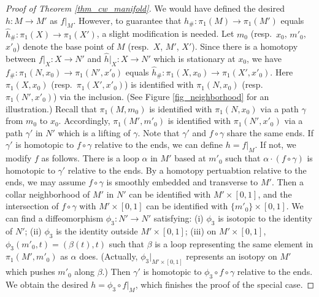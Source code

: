 \documentclass[12pt]{amsart}
\theoremstyle{plain}
\theoremstyle{definition}
\theoremstyle{question}
\theoremstyle{remark}
\theoremstyle{assumption}
\numberwithin{equation}{section}
\theoremstyle{bigthm}
\begin{document}
\begin{proof}[Proof of Theorem \ref{thm_cw_manifold}]
We would have defined the desired $h \colon  M \rightarrow M'$ as $f|_{M}$. However, to guarantee that $h_{\#} \colon  \pi_{1} (M) \rightarrow \pi_{1} (M')$ equals $\hat{h}_{\#} \colon  \pi_{1} (X) \rightarrow \pi_{1} (X')$, a slight modification is needed. Let $m_{0}$ (resp.~$x_{0}$, $m'_{0}$, $x'_{0}$) denote the base point of $M$ (resp.~$X$, $M'$, $X'$). Since there is a homotopy between $f|_{X} \colon  X \rightarrow N'$ and $\hat{h}|_{X} \colon  X \rightarrow N'$ which is stationary at $x_{0}$,  we have $f_{\#} \colon  \pi_{1} (N, x_{0}) \rightarrow \pi_{1} (N', x'_{0})$ equals $\hat{h}_{\#} \colon  \pi_{1} (X, x_{0}) \rightarrow \pi_{1} (X', x'_{0})$. Here $\pi_{1} (X, x_{0})$ (resp.~$\pi_{1} (X', x'_{0})$) is identified with $\pi_{1} (N, x_{0})$ (resp.~$\pi_{1} (N', x'_{0})$) via the inclusion. (See Figure \ref{fig_neighborhood} for an illustration.) Recall that $\pi_{1} (M, m_{0})$ is identified with $\pi_{1} (N, x_{0})$ via a path $\gamma$ from $m_{0}$ to $x_{0}$. Accordingly, $\pi_{1} (M', m'_{0})$ is identified with $\pi_{1} (N', x'_{0})$ via a path $\gamma'$ in $N'$ which is a lifting of $\gamma$. Note that $\gamma'$ and $f \circ \gamma$ share the same ends. If $\gamma'$ is homotopic to $f \circ \gamma$ relative to the ends, we can define $h= f|_{M}$. If not, we modify $f$ as follows. There is a loop $\alpha$ in $M'$ based at $m'_{0}$ such that $\alpha \cdot (f \circ \gamma)$ is homotopic to $\gamma'$ relative to the ends. By a homotopy pertuabtion relative to the ends, we may assume $f \circ \gamma$ is smoothly embedded and transverse to $M'$. Then a collar neighborhood of $M'$ in $N'$ can be identified with $M' \times [0,1]$, and the intersection of $f \circ \gamma$ with $M' \times [0,1]$ can be identified with $\{ m'_{0} \} \times [0,1]$. We can find a diffeomorphism $\phi_{3} \colon  N' \rightarrow N'$ satisfying: (i) $\phi_{3}$ is isotopic to the identity of $N'$; (ii) $\phi_{3}$ is the identity outside $M' \times [0,1]$; (iii) on $M' \times [0,1]$, $\phi_{3} (m'_{0}, t) = (\beta (t), t)$ such that $\beta$ is a loop representing the same element in $\pi_{1} (M', m'_{0})$ as $\alpha$ does. (Actually, $\phi_{3}|_{M' \times [0,1]}$ represents an isotopy on $M'$ which pushes $m'_{0}$ along $\beta$.) Then $\gamma'$ is homotopic to $\phi_{3} \circ f \circ \gamma$ relative to the ends. We obtain the desired $h= \phi_{3} \circ f|_{M}$, which finishes the proof of the special case.


\end{proof}
\end{document}
